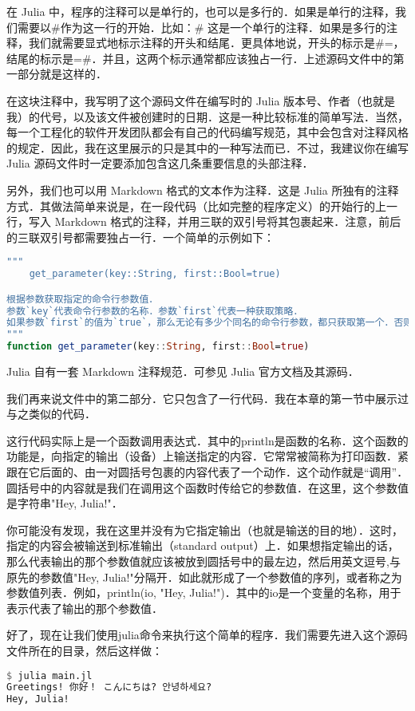 在 Julia 中，程序的注释可以是单行的，也可以是多行的．如果是单行的注释，我们需要以#作为这一行的开始．比如：# 这是一个单行的注释．如果是多行的注释，我们就需要显式地标示注释的开头和结尾．更具体地说，开头的标示是#=，结尾的标示是=#．并且，这两个标示通常都应该独占一行．上述源码文件中的第一部分就是这样的．

在这块注释中，我写明了这个源码文件在编写时的 Julia 版本号、作者（也就是我）的代号，以及该文件被创建时的日期．这是一种比较标准的简单写法．当然，每一个工程化的软件开发团队都会有自己的代码编写规范，其中会包含对注释风格的规定．因此，我在这里展示的只是其中的一种写法而已．不过，我建议你在编写 Julia 源码文件时一定要添加包含这几条重要信息的头部注释．

另外，我们也可以用 Markdown 格式的文本作为注释．这是 Julia 所独有的注释方式．其做法简单来说是，在一段代码（比如完整的程序定义）的开始行的上一行，写入 Markdown 格式的注释，并用三联的双引号将其包裹起来．注意，前后的三联双引号都需要独占一行．一个简单的示例如下：

\begin{lstlisting}[language=julia]
"""
    get_parameter(key::String, first::Bool=true)

根据参数获取指定的命令行参数值．
参数`key`代表命令行参数的名称．参数`first`代表一种获取策略．
如果参数`first`的值为`true`，那么无论有多少个同名的命令行参数，都只获取第一个．否则只获取最后一个．
"""
function get_parameter(key::String, first::Bool=true)
\end{lstlisting}

Julia 自有一套 Markdown 注释规范．可参见 Julia 官方文档及其源码．

我们再来说文件中的第二部分．它只包含了一行代码．我在本章的第一节中展示过与之类似的代码．

这行代码实际上是一个函数调用表达式．其中的println是函数的名称．这个函数的功能是，向指定的输出（设备）上输送指定的内容．它常常被简称为打印函数．紧跟在它后面的、由一对圆括号包裹的内容代表了一个动作．这个动作就是“调用”．圆括号中的内容就是我们在调用这个函数时传给它的参数值．在这里，这个参数值是字符串"Hey, Julia!"．

你可能没有发现，我在这里并没有为它指定输出（也就是输送的目的地）．这时，指定的内容会被输送到标准输出（standard output）上．如果想指定输出的话，那么代表输出的那个参数值就应该被放到圆括号中的最左边，然后用英文逗号,与原先的参数值"Hey, Julia!"分隔开．如此就形成了一个参数值的序列，或者称之为参数值列表．例如，println(io, "Hey, Julia!")．其中的io是一个变量的名称，用于表示代表了输出的那个参数值．

好了，现在让我们使用julia命令来执行这个简单的程序．我们需要先进入这个源码文件所在的目录，然后这样做：
\begin{lstlisting}[language=julia]
$ julia main.jl 
Greetings! 你好！ こんにちは? 안녕하세요?
Hey, Julia!
\end{lstlisting}

